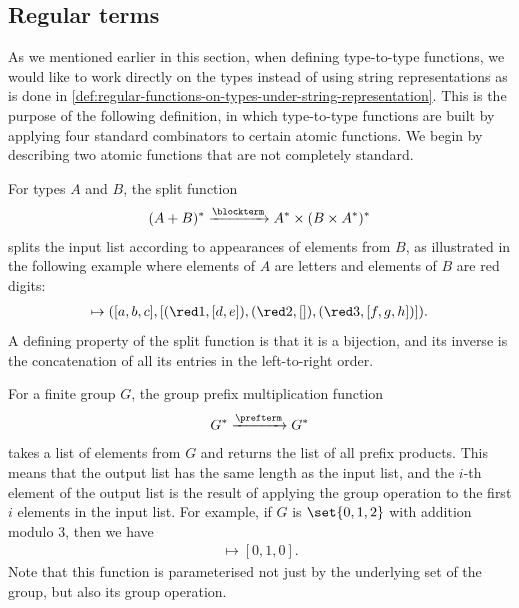 \subsection{Regular terms}
\label{sec:regular-terms}
As we mentioned earlier in this section, when defining type-to-type functions, we would like to work directly on the types instead of using string representations as is done in \cref{def:regular-functions-on-types-under-string-representation}. This is the purpose of the following definition, in which type-to-type functions are built by applying four standard combinators to certain atomic functions. We begin by describing two atomic functions that are not completely standard. 

\begin{myexample}[Split]\label{ex:split}
    For types $A$ and $B$, the split function 
    \begin{align*}
    (A + B)^* \xrightarrow{\blockterm} A^* \times (B \times A^*)^*
    \end{align*}
    splits the input list according to appearances of elements from $B$, as illustrated in the following example where elements of $A$ are letters and elements of $B$ are red digits:
    \begin{align*}
    [a,b,c,\red 1,d,e,\red 2,\red 3,f,g,h] \mapsto ([a,b,c],[(\red 1,[d,e]),(\red 2,[]), (\red 3,[f,g,h])]).
    \end{align*}
    A defining property of the split function is that it is a bijection, and its inverse is the concatenation of all its entries in the left-to-right order. 
\end{myexample}

\begin{myexample}
    For a finite group $G$, the group prefix multiplication function 
    \begin{align*}
    G^* \xrightarrow{\prefterm} G^*
    \end{align*}
    takes a list of elements from $G$ and returns the list of all prefix products. This means that the output list has the same length as the input list, and the $i$-th element of the output list is the result of applying the group operation  to the first $i$ elements in the input list. For example, if $G$ is $\set{0,1,2}$ with addition modulo 3, then we have
    \begin{align*}
    [0,1,2] \mapsto [0,1,0].
    \end{align*}
    Note that this function is parameterised not just by the underlying set of the group, but also its group operation. 
\end{myexample}

